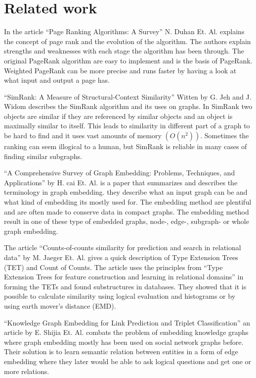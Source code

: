 \section{Related work}
In the article “Page Ranking Algorithms: A Survey” N. Duhan Et. Al.\cite{4809246} explains the concept of page rank and the evolution of the algorithm. The authors explain strengths and weaknesses with each stage the algorithm has been through. The original PageRank algorithm are easy to implement and is the basis of PageRank. Weighted PageRank can be more precise and runs faster by having a look at what input and output a page has. 

“SimRank: A Measure of Structural-Context Similarity” Witten by G. Jeh and J. Widom\cite{10.1145/775047.775126} describes the SimRank algorithm and its uses on graphs. In SimRank two objects are similar if they are referenced by similar objects and an object is maximally similar to itself. This leads to similarity in different part of a graph to be hard to find and it uses vast amounts of memory $(O(n^2))$. Sometimes the ranking can seem illogical to a human, but SimRank is reliable in many cases of finding similar subgraphs.

“A Comprehensive Survey of Graph Embedding: Problems, Techniques, and Applications” by H. cai Et. Al.\cite{8294302} is a paper that summarizes and describes the terminology in graph embedding. they describe what an input graph can be and what kind of embedding its mostly used for. The embedding method are plentiful and are often made to conserve data in compact graphs. The embedding method result in one of these type of embedded graphs, node-, edge-, subgraph- or whole graph embedding.


The article “Counts-of-counts similarity for prediction and search in relational data” by M. Jaeger Et. Al.\cite{jaeger2019counts}  gives a quick description of Type Extension Trees (TET) and Count of Counts. The article uses the principles from “Type Extension Trees for feature construction and learning in relational domains” in forming the TETs and found substructures in databases. They showed that it is possible to calculate similarity using logical evaluation and histograms or by using earth mover’s distance (EMD).

“Knowledge Graph Embedding for Link Prediction and Triplet Classification” an article by E. Shijia Et. Al. \cite{10.1007/978-981-10-3168-7_23} combats the problem of embedding knowledge graphs where graph embedding mostly has been used on social network graphs before.  Their solution is to learn semantic relation between entities in a form of edge embedding where they later would be able to ask logical questions and get one or more relations.

